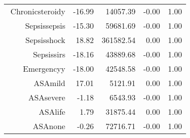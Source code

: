 \begin{tabular}{rrrrr}
$$  Chronic\-steroid\-y & -16.99 & 14057.39 & -0.00 & 1.00 \\ 
  Sepsis\-sepsis & -15.30 & 59681.69 & -0.00 & 1.00 \\ 
  Sepsis\-shock & 18.82 & 361582.54 & 0.00 & 1.00 \\ 
  Sepsis\-sirs & -18.16 & 43889.68 & -0.00 & 1.00 \\ 
  Emergency\-y & -18.00 & 42548.58 & -0.00 & 1.00 \\ 
  ASA\-mild & 17.01 & 5121.91 & 0.00 & 1.00 \\ 
  ASA\-severe & -1.18 & 6543.93 & -0.00 & 1.00 \\ 
  ASA\-life & 1.79 & 31875.44 & 0.00 & 1.00 \\ 
  ASA\-none & -0.26 & 72716.71 & -0.00 & 1.00 \\ 
   \hline
\end{tabular}


